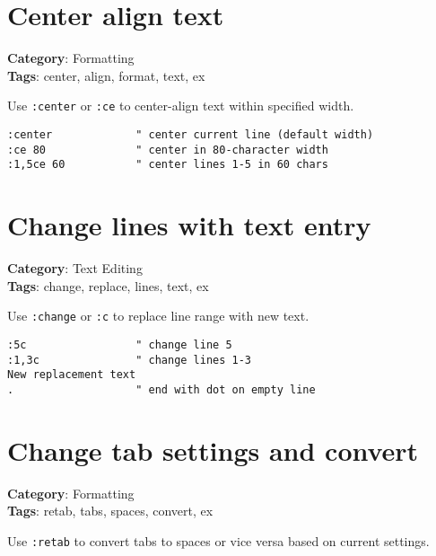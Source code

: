 {{{{{\section{Center align text}

\textbf{Category}: Formatting\\ \textbf{Tags}: center, align, format, text, ex
\vspace{0.5cm}

Use {\footnotesize \Verb§:center§} or {\footnotesize \Verb§:ce§} to center-align text within specified width.

\begin{Exa*}{}
\begin{Verbatim}[fontsize=\footnotesize, breaklines, breakanywhere]
:center             " center current line (default width)
:ce 80              " center in 80-character width
:1,5ce 60           " center lines 1-5 in 60 chars
\end{Verbatim}
\end{Exa*}

\section{Change lines with text entry}

\textbf{Category}: Text Editing\\ \textbf{Tags}: change, replace, lines, text, ex
\vspace{0.5cm}

Use {\footnotesize \Verb§:change§} or {\footnotesize \Verb§:c§} to replace line range with new text.

\begin{Exa*}{}
\begin{Verbatim}[fontsize=\footnotesize, breaklines, breakanywhere]
:5c                 " change line 5
:1,3c               " change lines 1-3
New replacement text
.                   " end with dot on empty line
\end{Verbatim}
\end{Exa*}

\section{Change tab settings and convert}

\textbf{Category}: Formatting\\ \textbf{Tags}: retab, tabs, spaces, convert, ex
\vspace{0.5cm}

Use {\footnotesize \Verb§:retab§} to convert tabs to spaces or vice versa based on current settings.

}}}}}

